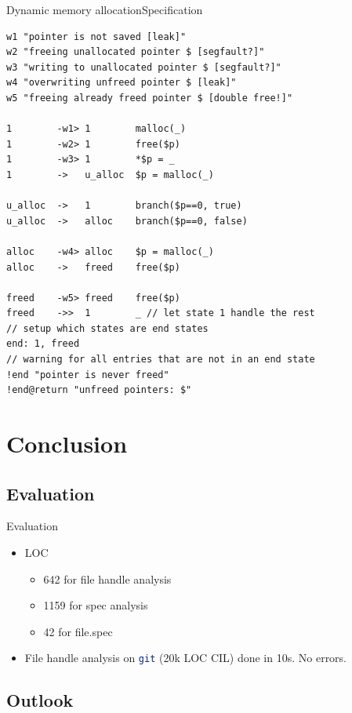 \documentclass{beamer}
\newcommand{\inlineSh}[1]{\lstinline[language=Bash]$#1$}
\begin{document}
\begin{frame}{Dynamic memory allocation}{Specification}
\begin{lstlisting}[basicstyle=\scriptsize\ttfamily]
w1 "pointer is not saved [leak]"
w2 "freeing unallocated pointer $ [segfault?]"
w3 "writing to unallocated pointer $ [segfault?]"
w4 "overwriting unfreed pointer $ [leak]"
w5 "freeing already freed pointer $ [double free!]"

1        -w1> 1        malloc(_)
1        -w2> 1        free($p)
1        -w3> 1        *$p = _
1        ->   u_alloc  $p = malloc(_)

u_alloc  ->   1        branch($p==0, true)
u_alloc  ->   alloc    branch($p==0, false)

alloc    -w4> alloc    $p = malloc(_)
alloc    ->   freed    free($p)

freed    -w5> freed    free($p)
freed    ->>  1        _ // let state 1 handle the rest
// setup which states are end states
end: 1, freed
// warning for all entries that are not in an end state
!end "pointer is never freed"
!end@return "unfreed pointers: $"
\end{lstlisting}
\end{frame}


\section{Conclusion}

\subsection{Evaluation}

\begin{frame}[fragile]{Evaluation}
\begin{itemize}
\item LOC
	\begin{itemize}
	\item 642 for file handle analysis \pause
	\item 1159 for spec analysis \pause
	\item 42 for file.spec \pause
	\end{itemize}
\item File handle analysis on \inlineSh{git} (20k LOC CIL) done in 10s. No errors.
\end{itemize}
\end{frame}


\subsection{Outlook}
\end{document}
